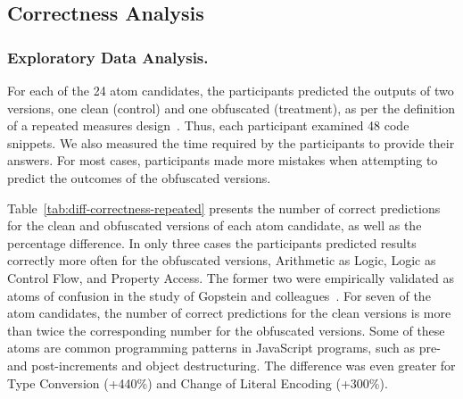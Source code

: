 \subsection{Correctness Analysis}\label{sec:repeated:correct}

\subsubsection*{Exploratory Data Analysis. }
For each of the 24 atom candidates, the participants predicted the outputs of two versions, one clean (control) and one obfuscated (treatment), as per the definition of a repeated measures design~\cite{Hunter-Experimenters}. Thus, each participant examined 48 code snippets.  We also measured the time required by the participants to provide their answers. For most cases, participants made more mistakes when attempting to predict the outcomes of the obfuscated versions. 

Table~\ref{tab:diff-correctness-repeated} presents the number of correct predictions for the clean and obfuscated versions of each atom candidate, as well as the percentage difference. In only three cases the participants predicted results correctly more often for the obfuscated versions, Arithmetic as Logic, Logic as Control Flow, and Property Access. The former two were empirically validated as atoms of confusion in the study of Gopstein and colleagues~\cite{DBLP:conf/sigsoft/GopsteinIYDZYC17}. For seven of the atom candidates, the number of correct predictions for the clean versions is more than twice the corresponding number for the obfuscated versions.  Some of these atoms are common programming patterns in JavaScript programs, such as pre- and post-increments and object destructuring. The difference was even greater for Type Conversion (+440\%) and Change of Literal Encoding (+300\%). 

